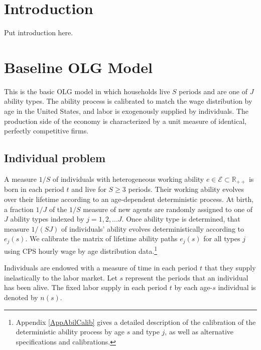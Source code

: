 \documentclass[letterpaper,12pt]{article}
\theoremstyle{definition}
\begin{document}
\begin{spacing}{1.5}

\section{Introduction}\label{SecIntro}

  Put introduction here.


\section{Baseline OLG Model}\label{SecModel}

  This is the basic OLG model in which households live $S$ periods and are one of $J$ ability types. The ability process is calibrated to match the wage distribution by age in the United States, and labor is exogenously supplied by individuals. The production side of the economy is characterized by a unit measure of identical, perfectly competitive firms.


  \subsection{Individual problem}\label{SecIndProb}

    A measure $1/S$ of individuals with heterogeneous working ability $e \in\mathcal{E}\subset\mathbb{R}_{++}$ is born in each period $t$ and live for $S\geq 3$ periods. Their working ability evolves over their lifetime according to an age-dependent deterministic process. At birth, a fraction $1/J$ of the $1/S$ measure of new agents are randomly assigned to one of $J$ ability types indexed by $j=1,2,...J$. Once ability type is determined, that measure $1/(SJ)$ of individuals' ability evolves deterministically according to $e_j(s)$. We calibrate the matrix of lifetime ability paths $e_j(s)$ for all types $j$ using CPS hourly wage by age distribution data.\footnote{Appendix \ref{AppAbilCalib} gives a detailed description of the calibration of the deterministic ability process by age $s$ and type $j$, as well as alternative specifications and calibrations.}

    Individuals are endowed with a measure of time in each period $t$ that they supply inelastically to the labor market. Let $s$ represent the periods that an individual has been alive. The fixed labor supply in each period $t$ by each age-$s$ individual is denoted by $n(s)$.


\end{spacing}
\end{document}
